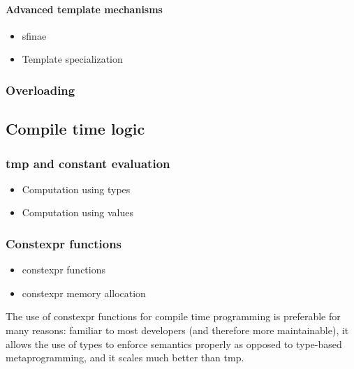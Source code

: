 \documentclass[../main]{subfiles}
\begin{document}
\paragraph{Advanced \cpp template mechanisms}

\begin{itemize}
\item \gls{sfinae}
\item Template specialization
\end{itemize}

\subsubsection{Overloading}

\subsection{Compile time logic}

\subsubsection{\acrlong{tmp} and constant evaluation}

\begin{itemize}
\item Computation using types
\item Computation using values
\end{itemize}

\subsubsection{Constexpr functions}

\begin{itemize}
\item \gls{constexpr} functions
\item \gls{constexpr} memory allocation
\end{itemize}

The use of \gls{constexpr} functions for compile time programming is preferable
for many reasons: familiar to most \cpp developers (and therefore more
maintainable), it allows the use of types to enforce semantics properly
as opposed to type-based metaprogramming, and it scales much better than
\gls{tmp}.
\end{document}
